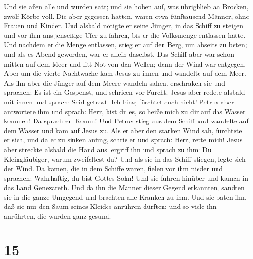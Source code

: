  Und sie aßen alle und wurden satt; und sie hoben auf,
was übrigblieb an Brocken, zwölf Körbe voll.  Die aber
gegessen hatten, waren etwa fünftausend Männer, ohne Frauen und Kinder.
 Und alsbald nötigte er seine Jünger, in das Schiff zu
steigen und vor ihm ans jenseitige Ufer zu fahren, bis er die Volksmenge
entlassen hätte.  Und nachdem er die Menge entlassen,
stieg er auf den Berg, um abseits zu beten; und als es Abend geworden,
war er allein daselbst.  Das Schiff aber war schon mitten
auf dem Meer und litt Not von den Wellen; denn der Wind war entgegen.
 Aber um die vierte Nachtwache kam Jesus zu ihnen und
wandelte auf dem Meer.  Als ihn aber die Jünger auf dem
Meere wandeln sahen, erschraken sie und sprachen: Es ist ein Gespenst,
und schrieen vor Furcht.  Jesus aber redete alsbald mit
ihnen und sprach: Seid getrost! Ich bin\textquotesingle s; fürchtet euch
nicht!  Petrus aber antwortete ihm und sprach: Herr, bist
du es, so heiße mich zu dir auf das Wasser kommen!  Da
sprach er: Komm! Und Petrus stieg aus dem Schiff und wandelte auf dem
Wasser und kam auf Jesus zu.  Als er aber den starken
Wind sah, fürchtete er sich, und da er zu sinken anfing, schrie er und
sprach: Herr, rette mich!  Jesus aber streckte alsbald
die Hand aus, ergriff ihn und sprach zu ihm: Du Kleingläubiger, warum
zweifeltest du?  Und als sie in das Schiff stiegen, legte
sich der Wind.  Da kamen, die in dem Schiffe waren,
fielen vor ihm nieder und sprachen: Wahrhaftig, du bist Gottes Sohn!
 Und sie fuhren hinüber und kamen in das Land Genezareth.
 Und da ihn die Männer dieser Gegend erkannten, sandten
sie in die ganze Umgegend und brachten alle Kranken zu ihm.
 Und sie baten ihn, daß sie nur den Saum seines Kleides
anrühren dürften; und so viele ihn anrührten, die wurden ganz gesund.

\hypertarget{section-14}{%
\section{15}\label{section-14}}

